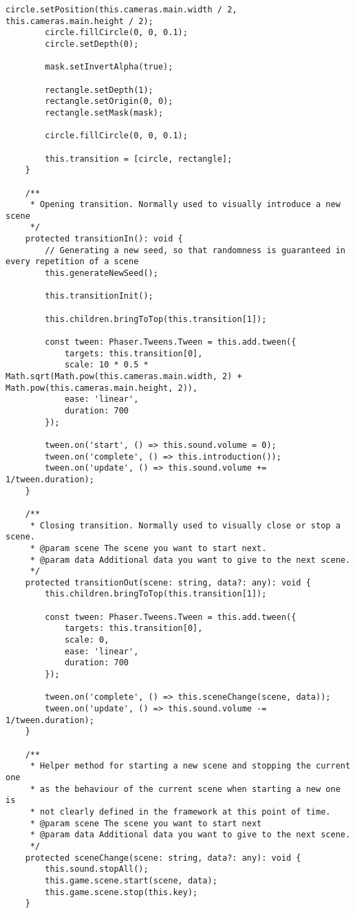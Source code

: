 \begin{lstlisting}[style=TypeScript, caption={baseScene.ts}]
        circle.setPosition(this.cameras.main.width / 2, this.cameras.main.height / 2);
        circle.fillCircle(0, 0, 0.1);
        circle.setDepth(0);

        mask.setInvertAlpha(true);

        rectangle.setDepth(1);
        rectangle.setOrigin(0, 0);
        rectangle.setMask(mask);

        circle.fillCircle(0, 0, 0.1);

        this.transition = [circle, rectangle];
    }

    /**
     * Opening transition. Normally used to visually introduce a new scene
     */
    protected transitionIn(): void {
        // Generating a new seed, so that randomness is guaranteed in every repetition of a scene
        this.generateNewSeed();

        this.transitionInit();

        this.children.bringToTop(this.transition[1]);

        const tween: Phaser.Tweens.Tween = this.add.tween({
            targets: this.transition[0],
            scale: 10 * 0.5 * Math.sqrt(Math.pow(this.cameras.main.width, 2) + Math.pow(this.cameras.main.height, 2)),
            ease: 'linear',
            duration: 700
        });

        tween.on('start', () => this.sound.volume = 0);
        tween.on('complete', () => this.introduction());
        tween.on('update', () => this.sound.volume += 1/tween.duration);
    }

    /**
     * Closing transition. Normally used to visually close or stop a scene.
     * @param scene The scene you want to start next.
     * @param data Additional data you want to give to the next scene.
     */
    protected transitionOut(scene: string, data?: any): void {
        this.children.bringToTop(this.transition[1]);

        const tween: Phaser.Tweens.Tween = this.add.tween({
            targets: this.transition[0],
            scale: 0,
            ease: 'linear',
            duration: 700
        });

        tween.on('complete', () => this.sceneChange(scene, data));
        tween.on('update', () => this.sound.volume -= 1/tween.duration);
    }

    /**
     * Helper method for starting a new scene and stopping the current one
     * as the behaviour of the current scene when starting a new one is
     * not clearly defined in the framework at this point of time.
     * @param scene The scene you want to start next
     * @param data Additional data you want to give to the next scene.
     */
    protected sceneChange(scene: string, data?: any): void {
        this.sound.stopAll();
        this.game.scene.start(scene, data);
        this.game.scene.stop(this.key);
    }


\end{lstlisting}
